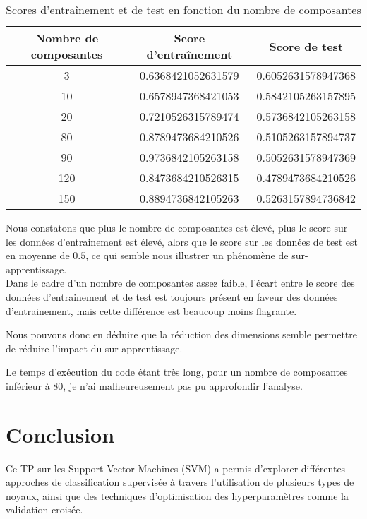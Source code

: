 \documentclass{article}
\begin{document}
\begin{table}[ht]
    \centering
    \begin{tabular}{|c|c|c|}
        \hline
        \textbf{Nombre de composantes} & \textbf{Score d'entraînement} & \textbf{Score de test} \\
        \hline
        3   & 0.6368421052631579 & 0.6052631578947368 \\
        \hline
        10  & 0.6578947368421053 & 0.5842105263157895 \\
        \hline
        20  & 0.7210526315789474 & 0.5736842105263158 \\
        \hline
        80  & 0.8789473684210526 & 0.5105263157894737 \\
        \hline
        90  & 0.9736842105263158 & 0.5052631578947369 \\
        \hline
        120 & 0.8473684210526315 & 0.4789473684210526 \\
        \hline
        150 & 0.8894736842105263 & 0.5263157894736842 \\
        \hline
    \end{tabular}
    \caption{Scores d'entraînement et de test en fonction du nombre de composantes}
    \label{tab:scores}
\end{table}

Nous constatons que plus le nombre de composantes est élevé, plus le score sur les données d'entrainement est élevé, alors que le score sur les données de test est en moyenne de $0.5$, ce qui semble nous illustrer un phénomène de sur-apprentissage. \\

Dans le cadre d'un nombre de composantes assez faible, l'écart entre le score des données d'entrainement et de test est toujours présent en faveur des données d'entrainement, mais cette différence est beaucoup moins flagrante.

Nous pouvons donc en déduire que la réduction des dimensions semble permettre de réduire l'impact du sur-apprentissage.

Le temps d'exécution du code étant très long, pour un nombre de composantes inférieur à 80, je n'ai malheureusement pas pu approfondir l'analyse. 



\section{Conclusion}

Ce TP sur les Support Vector Machines (SVM) a permis d'explorer différentes approches de classification supervisée à travers l'utilisation de plusieurs types de noyaux, ainsi que des techniques d'optimisation des hyperparamètres comme la validation croisée.\\
\end{document}
